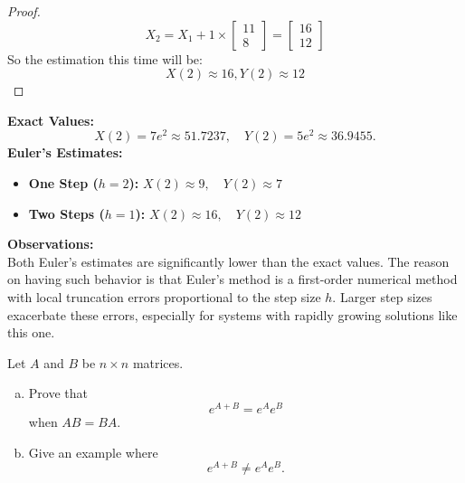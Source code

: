 \documentclass{article}
\begin{document}
\begin{proof}
    \[ X_2 = X_1 + 1 \times \begin{bmatrix} 11 \\ 8 \end{bmatrix} = \begin{bmatrix} 16 \\ 12 \end{bmatrix} \]
    So the estimation this time will be:
    \[ X(2) \approx 16, Y(2) \approx 12 \]
\end{proof}

\noindent \textbf{Exact Values:}
\[
    X(2) = 7e^2 \approx 51.7237, \quad Y(2) = 5e^2 \approx 36.9455.
\]
\textbf{Euler's Estimates:}
\begin{itemize}
    \item \textbf{One Step (\( h = 2 \)):} \( X(2) \approx 9, \quad Y(2) \approx 7 \)
    \item \textbf{Two Steps (\( h = 1 \)):} \( X(2) \approx 16, \quad Y(2) \approx 12 \)
\end{itemize}

\noindent \textbf{Observations:}
\\
Both Euler's estimates are significantly lower than the exact values. The reason on having such behavior is that
Euler's method is a first-order numerical method with local truncation errors proportional to the step size \( h \). 
Larger step sizes exacerbate these errors, especially for systems with rapidly growing solutions like this one.

\begin{problem}
[Bonus]
    Let \(A\) and \(B\) be \(n\times n\) matrices.
    \begin{enumerate}[a)]
        \item Prove that
        \[e^{A+B} = e^Ae^B\]
        when \(AB=BA\).
        \item Give an example where
        \[e^{A+B} \neq e^Ae^B.\]
    \end{enumerate}
\end{problem}
\end{document}
